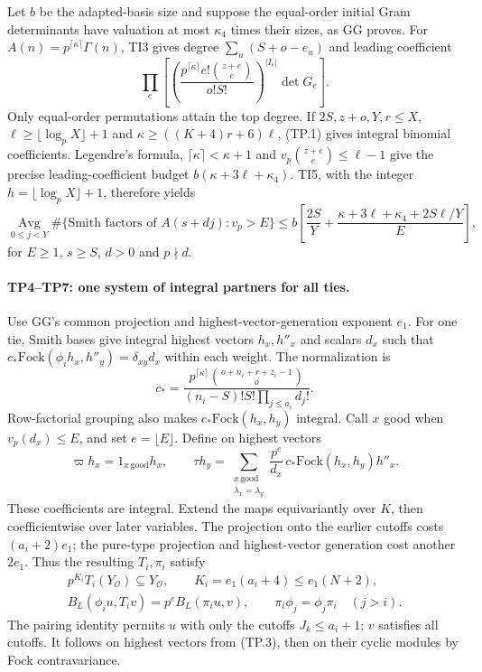 \documentclass[11pt,a4paper]{article}
\numberwithin{equation}{section}
\theoremstyle{remark}\newtheorem{remark}[theorem]{Remark}
\begin{document}
Let $b$ be the adapted-basis size and suppose the equal-order initial Gram
determinants have valuation at most $\kappa_4$ times their sizes, as GG
proves. For $A(n)=p^{\lceil\kappa\rceil}\Gamma(n)$, TI3 gives degree
$\sum_u(S+o-e_u)$ and leading coefficient
\[
 \prod_e\left[
 \left(\frac{p^{\lceil\kappa\rceil}e!\binom{z+e}e}{o!S!}\right)^{|I_e|}
 \det G_e\right].
\]
Only equal-order permutations attain the top degree. If
$2S,z+o,Y,r\le X$,
$\ell\ge\lfloor\log_pX\rfloor+1$ and
$\kappa\ge((K+4)r+6)\ell$, (TP.1) gives integral binomial coefficients.
Legendre's formula, $\lceil\kappa\rceil<\kappa+1$ and
$v_p\binom{z+e}e\le\ell-1$ give the precise leading-coefficient budget
$b(\kappa+3\ell+\kappa_4)$. TI5, with the integer
$h=\lfloor\log_pX\rfloor+1$, therefore yields
\[
 \underset{0\le j<Y}{\operatorname{Avg}}
 \#\{\text{Smith factors of }A(s+dj):v_p>E\}
 \le b\left[\frac{2S}{Y}
 +\frac{\kappa+3\ell+\kappa_4+2S\ell/Y}{E}\right],
 \tag{TP.2}
\]
for $E\ge1$, $s\ge S$, $d>0$ and $p\nmid d$.

\paragraph{TP4--TP7: one system of integral partners for all ties.}
Use GG's common projection and highest-vector-generation exponent $e_1$.
For one tie, Smith bases give integral highest vectors $h_x,h''_x$ and
scalars $d_x$ such that
$c_*\mathrm{Fock}(\phi_i h_x,h''_y)=\delta_{xy}d_x$ within each weight.
The normalization is
\[
 c_*=
 \frac{p^{\lceil\kappa\rceil}\binom{o+n_i+r+z_i-1}o}
 {(n_i-S)!S!\prod_{j\le a_i}d_j!}.
\]
Row-factorial grouping also makes $c_*\mathrm{Fock}(h_x,h_y)$ integral.
Call $x$ good when $v_p(d_x)\le E$, and set $e=\lfloor E\rfloor$.
Define on highest vectors
\[
 \varpi h_x=1_{x\,\mathrm{good}}h_x,\qquad
 \tau h_y=
 \sum_{\substack{x\,\mathrm{good}\\\lambda_x=\lambda_y}}
 \frac{p^e}{d_x}\,c_*\mathrm{Fock}(h_x,h_y)h''_x.
 \tag{TP.3}
\]
These coefficients are integral. Extend the maps equivariantly over $K$,
then coefficientwise over later variables. The projection onto the earlier
cutoffs costs $(a_i+2)e_1$; the pure-type projection and highest-vector
generation cost another $2e_1$. Thus the resulting $T_i,\pi_i$ satisfy
\[
 \begin{gathered}
 p^{K_i}T_i(Y_{\mathcal O})\subseteq Y_{\mathcal O},
 \qquad K_i=e_1(a_i+4)\le e_1(N+2),\\
 B_L(\phi_i u,T_i v)=p^eB_L(\pi_i u,v),
 \qquad \pi_i\phi_j=\phi_j\pi_i\quad(j>i).
 \end{gathered}
 \tag{TP.4}
\]
The pairing identity permits $u$ with only the cutoffs
$J_k\le a_i+1$; $v$ satisfies all cutoffs. It follows on highest vectors
from (TP.3), then on their cyclic modules by Fock contravariance.
\end{document}

